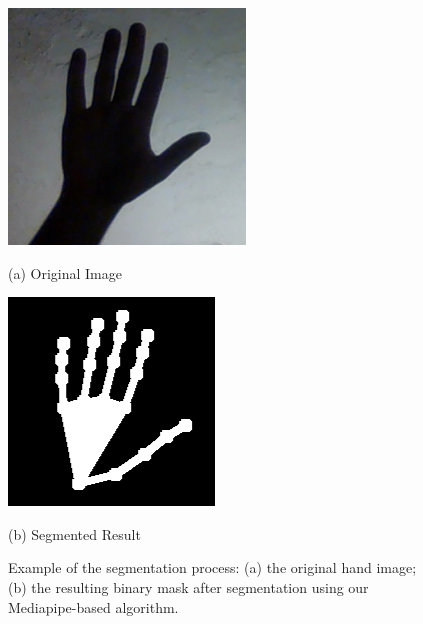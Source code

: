 \documentclass{article}
\begin{document}
\begin{figure}[htb]
  \begin{minipage}[b]{0.48\linewidth}
    \centering
    \includegraphics[width=\linewidth]{Hand-Original.png}
    \caption*{(a) Original Image}
  \end{minipage}
  \hfill
  \begin{minipage}[b]{0.48\linewidth}
    \centering
    \includegraphics[width=\linewidth]{Hand-Result.png}
    \caption*{(b) Segmented Result}
  \end{minipage}
  \caption{Example of the segmentation process: (a) the original hand image; (b) the resulting binary mask after segmentation using our Mediapipe-based algorithm.}
  \label{fig:segmentation}
\end{figure}
\end{document}
